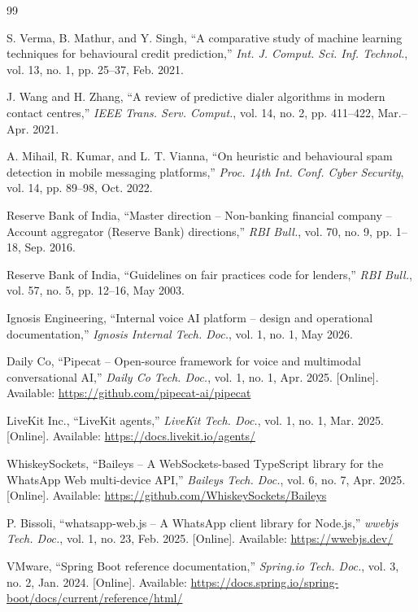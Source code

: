 \renewcommand{\bibname}{References}
\begin{thebibliography}{99}

S. Verma, B. Mathur, and Y. Singh, ``A comparative study of machine learning techniques for behavioural credit prediction,'' \emph{Int. J. Comput. Sci. Inf. Technol.}, vol. 13, no. 1, pp. 25--37, Feb. 2021.

J. Wang and H. Zhang, ``A review of predictive dialer algorithms in modern contact centres,'' \emph{IEEE Trans. Serv. Comput.}, vol. 14, no. 2, pp. 411--422, Mar.--Apr. 2021.

A. Mihail, R. Kumar, and L. T. Vianna, ``On heuristic and behavioural spam detection in mobile messaging platforms,'' \emph{Proc. 14th Int. Conf. Cyber Security}, vol. 14, pp. 89--98, Oct. 2022.

Reserve Bank of India, ``Master direction -- Non-banking financial company -- Account aggregator (Reserve Bank) directions,'' \emph{RBI Bull.}, vol. 70, no. 9, pp. 1--18, Sep. 2016.

Reserve Bank of India, ``Guidelines on fair practices code for lenders,'' \emph{RBI Bull.}, vol. 57, no. 5, pp. 12--16, May 2003.

Ignosis Engineering, ``Internal voice AI platform -- design and operational documentation,'' \emph{Ignosis Internal Tech. Doc.}, vol. 1, no. 1, May 2026.

Daily Co, ``Pipecat -- Open-source framework for voice and multimodal conversational AI,'' \emph{Daily Co Tech. Doc.}, vol. 1, no. 1, Apr. 2025. [Online]. Available: \url{https://github.com/pipecat-ai/pipecat}

LiveKit Inc., ``LiveKit agents,'' \emph{LiveKit Tech. Doc.}, vol. 1, no. 1, Mar. 2025. [Online]. Available: \url{https://docs.livekit.io/agents/}

WhiskeySockets, ``Baileys -- A WebSockets-based TypeScript library for the WhatsApp Web multi-device API,'' \emph{Baileys Tech. Doc.}, vol. 6, no. 7, Apr. 2025. [Online]. Available: \url{https://github.com/WhiskeySockets/Baileys}

P. Bissoli, ``whatsapp-web.js -- A WhatsApp client library for Node.js,'' \emph{wwebjs Tech. Doc.}, vol. 1, no. 23, Feb. 2025. [Online]. Available: \url{https://wwebjs.dev/}

VMware, ``Spring Boot reference documentation,'' \emph{Spring.io Tech. Doc.}, vol. 3, no. 2, Jan. 2024. [Online]. Available: \url{https://docs.spring.io/spring-boot/docs/current/reference/html/}


\end{thebibliography}
